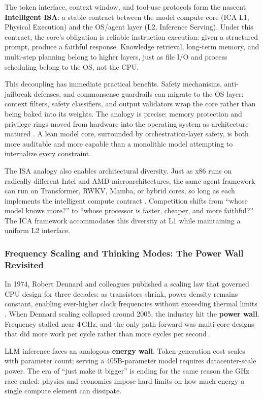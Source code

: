 The token interface, context window, and tool-use protocols form the nascent \textbf{Intelligent ISA}: a stable contract between the model compute core (ICA L1, Physical Execution) and the OS/agent layer (L2, Inference Serving). Under this contract, the core's obligation is reliable instruction execution: given a structured prompt, produce a faithful response. Knowledge retrieval, long-term memory, and multi-step planning belong to higher layers, just as file I/O and process scheduling belong to the OS, not the CPU.

This decoupling has immediate practical benefits. Safety mechanisms, anti-jailbreak defenses, and commonsense guardrails can migrate to the OS layer: context filters, safety classifiers, and output validators wrap the core rather than being baked into its weights. The analogy is precise: memory protection and privilege rings moved from hardware into the operating system as architecture matured \cite{ritchie_thompson_1974}. A lean model core, surrounded by orchestration-layer safety, is both more auditable and more capable than a monolithic model attempting to internalize every constraint.

The ISA analogy also enables architectural diversity. Just as x86 runs on radically different Intel and AMD microarchitectures, the same agent framework can run on Transformer, RWKV, Mamba, or hybrid cores, so long as each implements the intelligent compute contract \cite{hennessy_patterson_2019}. Competition shifts from ``whose model knows more?'' to ``whose processor is faster, cheaper, and more faithful?'' The ICA framework accommodates this diversity at L1 while maintaining a uniform L2 interface.

\subsubsection{Frequency Scaling and Thinking Modes: The Power Wall Revisited}

In 1974, Robert Dennard and colleagues published a scaling law that governed CPU design for three decades: as transistors shrink, power density remains constant, enabling ever-higher clock frequencies without exceeding thermal limits \cite{dennard_1974}. When Dennard scaling collapsed around 2005, the industry hit the \textbf{power wall}. Frequency stalled near 4\,GHz, and the only path forward was multi-core designs that did more work per cycle rather than more cycles per second \cite{esmaeilzadeh_2011}.

LLM inference faces an analogous \textbf{energy wall}. Token generation cost scales with parameter count; serving a 405B-parameter model requires datacenter-scale power. The era of ``just make it bigger'' is ending for the same reason the GHz race ended: physics and economics impose hard limits on how much energy a single compute element can dissipate.

